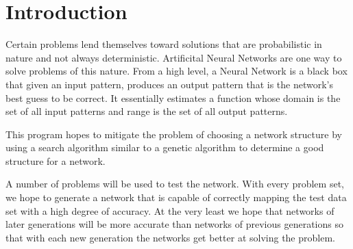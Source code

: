 \section{Introduction}
Certain problems lend themselves toward solutions that are probabilistic in nature and not always deterministic. 
Artificital Neural Networks are one way to solve problems of this nature. From a high level, a Neural Network is a black
box that given an input pattern, produces an output pattern that is the network's best guess to be correct. 
It essentially estimates a function whose domain is the set of all input patterns and range is the set of all output patterns.

This program hopes to mitigate the problem of choosing a network structure by using a search algorithm similar to a genetic algorithm to determine a good structure for a network. 

A number of problems will be used to test the network.  With every problem set, we hope to generate a network that is capable of correctly mapping the test data set with a high degree of accuracy.  At the very least we hope that networks of later generations will be more accurate than networks of previous generations so that with each new generation the networks get better at solving the problem.
